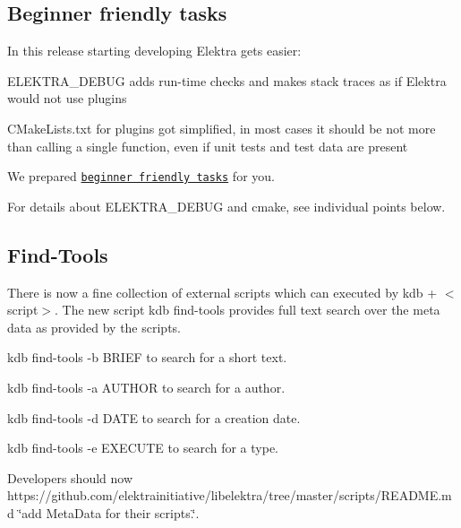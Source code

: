 \subsection*{Beginner friendly tasks}

In this release starting developing Elektra gets easier\+:


\begin{DoxyItemize}
\item {\ttfamily E\+L\+E\+K\+T\+R\+A\+\_\+\+D\+E\+B\+U\+G} adds run-\/time checks and makes stack traces as if Elektra would not use plugins
\item {\ttfamily C\+Make\+Lists.\+txt} for plugins got simplified, in most cases it should be not more than calling a single function, even if unit tests and test data are present
\item We prepared \href{https://github.com/ElektraInitiative/libelektra/issues?q=is%3Aissue+is%3Aopen+label%3A%22beginner+friendly%22}{\tt beginner friendly tasks} for you.
\end{DoxyItemize}

For details about {\ttfamily E\+L\+E\+K\+T\+R\+A\+\_\+\+D\+E\+B\+U\+G} and cmake, see individual points below.

\subsection*{Find-\/\+Tools}

There is now a fine collection of external scripts which can executed by {\ttfamily kdb + $<$script$>$}. The new script {\ttfamily kdb find-\/tools} provides full text search over the meta data as provided by the scripts.


\begin{DoxyItemize}
\item {\ttfamily kdb find-\/tools -\/b B\+R\+I\+E\+F} to search for a short text.
\item {\ttfamily kdb find-\/tools -\/a A\+U\+T\+H\+O\+R} to search for a author.
\item {\ttfamily kdb find-\/tools -\/d D\+A\+T\+E} to search for a creation date.
\item {\ttfamily kdb find-\/tools -\/e E\+X\+E\+C\+U\+T\+E} to search for a type.
\end{DoxyItemize}

Developers should now https\+://github.com/elektrainitiative/libelektra/tree/master/scripts/\+R\+E\+A\+D\+M\+E.\+md \char`\"{}add Meta\+Data for their scripts.\char`\"{}.

